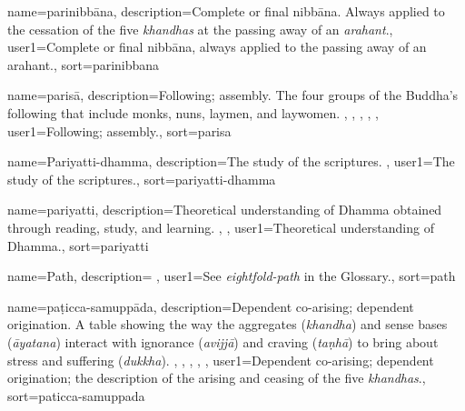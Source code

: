 {
name=parinibb\=ana,
description={Complete or final nibb\=ana. Always applied to the cessation of the five \textit{khandhas} at the passing away of an \textit{arahant}.},
user1={Complete or final nibb\=ana, always applied to the passing away of an arahant.},
sort={parinibbana}
}

{
name=paris\=a,
description={Following; assembly. The four groups of the Buddha's following that include monks, nuns, laymen, and laywomen. \protect \seepre %
\protect {}, \protect {}, \protect {}, \protect {}, \protect {}%
\protect \seepost %
},
user1={Following; assembly.},
sort={parisa}
}

{
name=Pariyatti-dhamma,
description={The study of the scriptures. \protect \seepre %
\protect {}%
\protect \seepost %
},
user1={The study of the scriptures.},
sort={pariyatti-dhamma}
}

{
name={pariyatti},
description={Theoretical understanding of Dhamma obtained through reading, study, and learning. \protect \seepre %
\protect {}, \protect {}%
\protect \seepost %
},
user1={Theoretical understanding of Dhamma.},
sort={pariyatti}
}

{
name=Path,
description={\nopostdesc \protect \seepre %
\protect {}%
\protect \seepost %
},
user1={See \textit{eightfold-path} in the Glossary.},
sort={path}
}

{
name={pa\d{t}icca-samupp\=ada},
description={Dependent co-arising; dependent origination. A table showing the way the aggregates (\textit{khandha}) and sense bases (\textit{\=aya\-tana}) interact with ignorance (\textit{avijj\=a}) and craving (\textit{ta\d{n}h\=a}) to bring about stress and suffering (\textit{dukkha}). \protect \seepre %
\protect {}, \protect {}, \protect {}, \protect {}, \protect {}%
\protect \seepost %
},
user1={Dependent co-arising; dependent origination; the description of the arising and ceasing of the five \textit{khandhas}.},
sort={paticca-samuppada}
}

